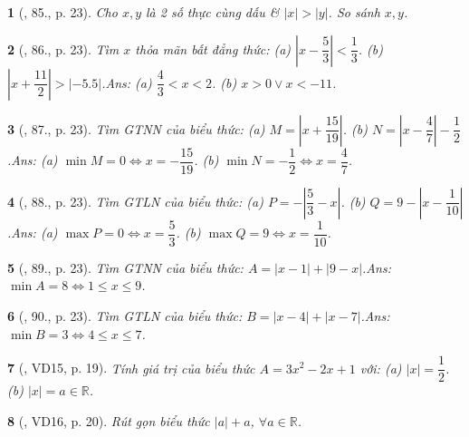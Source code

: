 \documentclass{article}
\newtheorem{baitoan}{}
\begin{document}
\begin{baitoan}[\cite{Tuyen_Toan_7}, 85., p. 23]
	Cho $x,y$ là 2 số thực cùng dấu \& $|x| > |y|$. So sánh $x,y$.
\end{baitoan}

\begin{baitoan}[\cite{Tuyen_Toan_7}, 86., p. 23]
	Tìm $x$ thỏa mãn bất đẳng thức: (a) $\left|x - \dfrac{5}{3}\right| < \dfrac{1}{3}$. (b) $\left|x + \dfrac{11}{2}\right| > |-5.5|$.\hfill{\sf Ans:} (a) $\dfrac{4}{3} < x < 2$. (b) $x > 0\lor x < -11$.
\end{baitoan}

\begin{baitoan}[\cite{Tuyen_Toan_7}, 87., p. 23]
	Tìm {\rm GTNN} của biểu thức: (a) $M = \left|x + \dfrac{15}{19}\right|$. (b) $N = \left|x - \dfrac{4}{7}\right| - \dfrac{1}{2}$.\hfill{\sf Ans:} (a) $\min M = 0\Leftrightarrow x = -\dfrac{15}{19}$. (b) $\min N = -\dfrac{1}{2}\Leftrightarrow x = \dfrac{4}{7}$.
\end{baitoan}

\begin{baitoan}[\cite{Tuyen_Toan_7}, 88., p. 23]
	Tìm {\rm GTLN} của biểu thức: (a) $P = -\left|\dfrac{5}{3} - x\right|$. (b) $Q = 9 - \left|x - \dfrac{1}{10}\right|$.\hfill{\sf Ans:} (a) $\max P = 0\Leftrightarrow x = \dfrac{5}{3}$. (b) $\max Q = 9\Leftrightarrow x = \dfrac{1}{10}$.
\end{baitoan}

\begin{baitoan}[\cite{Tuyen_Toan_7}, 89., p. 23]
	Tìm {\rm GTNN} của biểu thức: $A = |x - 1| + |9 - x|$.\hfill{\sf Ans:} $\min A = 8\Leftrightarrow 1\le x\le 9$.
\end{baitoan}

\begin{baitoan}[\cite{Tuyen_Toan_7}, 90., p. 23]
	Tìm {\rm GTLN} của biểu thức: $B = |x - 4| + |x - 7|$.\hfill{\sf Ans:} $\min B = 3\Leftrightarrow 4\le x\le 7$.
\end{baitoan}

\begin{baitoan}[\cite{Binh_Toan_7_tap_1}, VD15, p. 19]
	Tính giá trị của biểu thức $A = 3x^2 - 2x + 1$ với: (a) $|x| = \dfrac{1}{2}$. (b) $|x| = a\in\mathbb{R}$.
\end{baitoan}

\begin{baitoan}[\cite{Binh_Toan_7_tap_1}, VD16, p. 20]
	Rút gọn biểu thức $|a| + a$, $\forall a\in\mathbb{R}$.
\end{baitoan}
\end{document}
